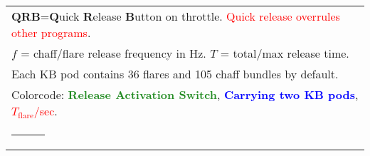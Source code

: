 \documentclass[a4paper,11pt,usenames,dvipsnames]{letter}
\makeatletter
\newcommand{\thickhline}{\noalign {\ifnum 0=`}\fi \hrule height 2pt \futurelet \reserved@a \@xhline}
\newcommand{\rn}[1]{\textcolor{Red}{#1}}
\newcommand{\gb}[1]{\textcolor{ForestGreen}{\textbf{#1}}}
\newcommand{\bb}[1]{\textcolor{Blue} {\textbf{#1}}}
\newcommand{\tb}[1]{\textbf{#1}}
\makeatother
\begin{document}
\begin{tabular}{l|c|c|c|c|c|c|c}
\multicolumn{8}{l}{\tb{QRB}=\tb{Q}uick \tb{R}elease \tb{B}utton on throttle. \rn{Quick release overrules other programs}.}\\
\multicolumn{8}{l}{$f$ = chaff/flare release frequency in Hz. $T$ = total/max release time.} \\
\multicolumn{8}{l}{Each KB pod contains 36 flares and 105 chaff bundles by default.}\\
\multicolumn{8}{l}{Colorcode: \gb{Release Activation Switch}, \bb{Carrying two KB pods}, \rn{$T_\mathrm{flare}$/sec}.} \\
\thickhline
\end{tabular}\\
%
\end{document}
